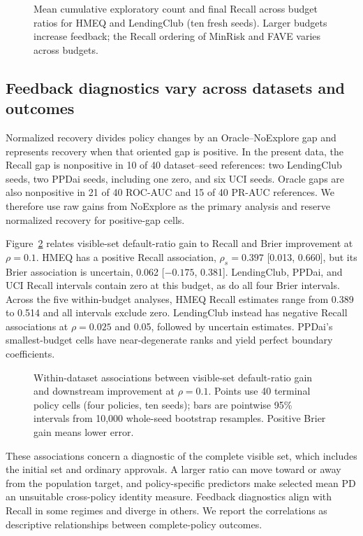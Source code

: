 \begin{figure}[t]
\centering
{}
\caption{Mean cumulative exploratory count and final Recall across budget ratios for HMEQ and LendingClub (ten fresh seeds). Larger budgets increase feedback; the Recall ordering of MinRisk and FAVE varies across budgets.}
\label{fig:budgetsweep}
\end{figure}

\subsection{Feedback diagnostics vary across datasets and outcomes}
Normalized recovery divides policy changes by an Oracle--NoExplore gap and represents recovery when that oriented gap is positive. In the present data, the Recall gap is nonpositive in 10 of 40 dataset--seed references: two LendingClub seeds, two PPDai seeds, including one zero, and six UCI seeds. Oracle gaps are also nonpositive in 21 of 40 ROC-AUC and 15 of 40 PR-AUC references. We therefore use raw gains from NoExplore as the primary analysis and reserve normalized recovery for positive-gap cells.

Figure~\ref{fig:rawgain} relates visible-set default-ratio gain to Recall and Brier improvement at $\rho=0.1$. HMEQ has a positive Recall association, $\rho_s=0.397$ [0.013, 0.660], but its Brier association is uncertain, 0.062 [$-0.175$, 0.381]. LendingClub, PPDai, and UCI Recall intervals contain zero at this budget, as do all four Brier intervals. Across the five within-budget analyses, HMEQ Recall estimates range from 0.389 to 0.514 and all intervals exclude zero. LendingClub instead has negative Recall associations at $\rho=0.025$ and 0.05, followed by uncertain estimates. PPDai's smallest-budget cells have near-degenerate ranks and yield perfect boundary coefficients.

\begin{figure}[t]
\centering
{}
\caption{Within-dataset associations between visible-set default-ratio gain and downstream improvement at $\rho=0.1$. Points use 40 terminal policy cells (four policies, ten seeds); bars are pointwise 95\% intervals from 10,000 whole-seed bootstrap resamples. Positive Brier gain means lower error.}
\label{fig:rawgain}
\end{figure}

These associations concern a diagnostic of the complete visible set, which includes the initial set and ordinary approvals. A larger ratio can move toward or away from the population target, and policy-specific predictors make selected mean PD an unsuitable cross-policy identity measure. Feedback diagnostics align with Recall in some regimes and diverge in others. We report the correlations as descriptive relationships between complete-policy outcomes.

